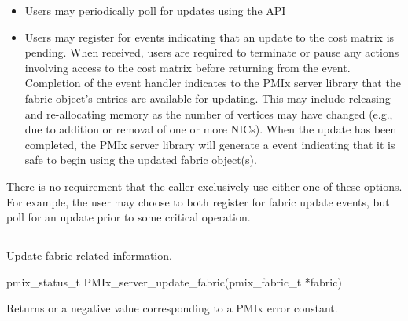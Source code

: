 \begin{itemize}

    \item Users may periodically poll for updates using the  \ac{API}

    \item Users may register for  events indicating that an update to the cost matrix is pending. When received, users are required to terminate or pause any actions involving access to the cost matrix before returning from the event. Completion of the  event handler indicates to the \ac{PMIx} server library that the fabric object's entries are available for updating. This may include releasing and re-allocating memory as the number of vertices may have changed (e.g., due to addition or removal of one or more \acp{NIC}). When the update has been completed, the \ac{PMIx} server library will generate a  event indicating that it is safe to begin using the updated fabric object(s).

\end{itemize}

There is no requirement that the caller exclusively use either one of these options. For example, the user may choose to both register for fabric update events, but poll for an update prior to some critical operation.

\subsection{}

\summary

Update fabric-related information.

\format

\cspecificstart
\begin{codepar}
pmix_status_t
PMIx_server_update_fabric(pmix_fabric_t *fabric)
\end{codepar}
\cspecificend

\begin{arglist}
\end{arglist}

Returns  or a negative value corresponding to a \ac{PMIx} error constant.

